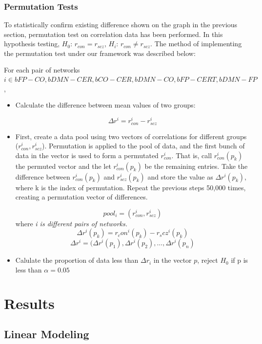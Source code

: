 \documentclass[11pt]{article}
\begin{document}
\subsubsection{Permutation Tests}

To statistically confirm existing difference shown on the graph in the previous section, permutation test on correlation data has been performed. In this hypothesis testing, $H_{0}$: $r_{con} = r_{scz}$, $H_{i}$: $r_{con} \neq r_{scz}$.
The method of implementing the permutation test under our framework was described below:

For each pair of networks $ i \in {bFP-CO, bDMN-CER, bCO-CER, bDMN-CO, bFP-CERT, bDMN-FP} $, 
\begin{itemize}
\item Calculate the difference between mean values of two groups:

$$ \Delta r^i =  r_{con}^i - r_{scz}^i $$ 

\item  First, create a data pool using two vectors of correlations for different groups ($r_{con}^i, r_{scz}^i$). Permutation is applied to the pool of data, and the first bunch of data in the vector is used to form a permutated $ r_{con}^i$. That is, call $ r_{con}^i(p_k)$ the permuted vector and the let $r_{con}^i(p_k)$ be the remaining entries. Take the difference between $ r_{con}^i(p_k)$ and  $r_{scz}^i(p_k)$ and store the value as $\Delta r^i(p_k)$, where k is the index of permutation. Repeat the previous steps 50,000 times, creating a permutation vector of differences.

$$ pool_{i} = (r_{con}^i, r_{scz}^i) $$ where \textit{ i is different pairs of networks.}
$$ \Delta r^i(p_k) = r_con^i(p_k) - r_scz^i(p_k) $$ 
$$ \Delta r^i = (\Delta r^i(p_1), \Delta r^i(p_2), \dots, \Delta r^i(p_n) $$

\item Calulate the proportion of data less than $\Delta r_i$ in the vector $p$, reject $H_0$ if p is less than $\alpha = 0.05$
\end{itemize}


\section{Results}

\subsection{Linear Modeling}
\end{document}
